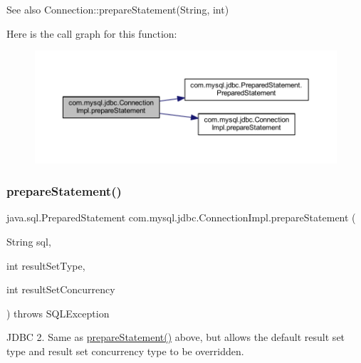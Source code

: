 \begin{DoxySeeAlso}{See also}
Connection\+::prepare\+Statement(\+String, int) 
\end{DoxySeeAlso}
Here is the call graph for this function\+:\nopagebreak
\begin{figure}[H]
\begin{center}
\leavevmode
\includegraphics[width=350pt]{classcom_1_1mysql_1_1jdbc_1_1_connection_impl_a43922e839ec8ab1bac49422ad317b1d8_cgraph}
\end{center}
\end{figure}
\mbox{\label{classcom_1_1mysql_1_1jdbc_1_1_connection_impl_a18afe2c6cb7638fb24284863be9a4350}} 
\subsubsection{\texorpdfstring{prepare\+Statement()}{prepareStatement()}\hspace{0.1cm}{\footnotesize\ttfamily [3/6]}}
{\footnotesize\ttfamily java.\+sql.\+Prepared\+Statement com.\+mysql.\+jdbc.\+Connection\+Impl.\+prepare\+Statement (\begin{DoxyParamCaption}\item[{String}]{sql,  }\item[{int}]{result\+Set\+Type,  }\item[{int}]{result\+Set\+Concurrency }\end{DoxyParamCaption}) throws S\+Q\+L\+Exception}

J\+D\+BC 2. Same as \mbox{\hyperlink{classcom_1_1mysql_1_1jdbc_1_1_connection_impl_ae88b1d09280bb34e6e52efff869ce61f}{prepare\+Statement()}} above, but allows the default result set type and result set concurrency type to be overridden.


